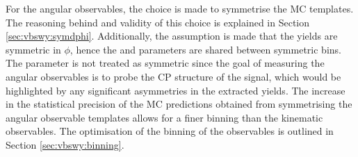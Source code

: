 For the angular observables, the choice is made to symmetrise the MC templates. The reasoning behind and validity of this choice is explained in Section \ref{sec:vbswy:symdphi}. Additionally, the assumption is made that the \qcdwy yields are symmetric in $\phi$, hence the \bh and \bl parameters are shared between symmetric bins. The \muew parameter is not treated as symmetric since the goal of measuring the angular observables is to probe the CP structure of the signal, which would be highlighted by any significant asymmetries in the extracted \ewwy yields. The increase in the statistical precision of the MC predictions obtained from symmetrising the angular observable templates allows for a finer binning than the kinematic observables. The optimisation of the binning of the observables is outlined in Section \ref{sec:vbswy:binning}.

